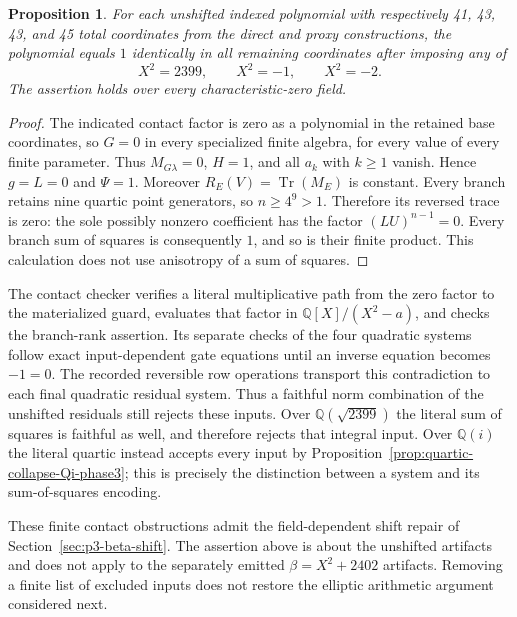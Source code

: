 \documentclass[11pt]{article}
\newtheorem{proposition}[theorem]{Proposition}
\theoremstyle{definition}
\begin{document}
\begin{proposition}\label{prop:indexed-contact-value-one-phase3}
For each unshifted indexed polynomial with respectively
41, 43, 43, and 45 total coordinates from the direct and proxy constructions,
the polynomial equals $1$ identically in all remaining
coordinates after imposing any of
\[
                         X^2=2399,\qquad X^2=-1,
                              \qquad X^2=-2.
\]
The assertion holds over every characteristic-zero field.
\end{proposition}
\begin{proof}
The indicated contact factor is zero as a polynomial in the
retained base coordinates, so $G=0$ in every specialized
finite algebra, for every value of every finite parameter.
Thus $M_{G\lambda}=0$, $H=1$, and all $a_k$ with $k\ge1$
vanish.  Hence $g=L=0$ and $\Psi=1$.
Moreover $R_E(V)=\operatorname{Tr}(M_E)$ is constant.
Every branch retains nine quartic point generators, so
$n\ge4^9>1$.  Therefore its reversed trace is zero:
the sole possibly nonzero coefficient has the factor
$(LU)^{n-1}=0$.  Every branch sum of squares is consequently
$1$, and so is their finite product.  This calculation does
not use anisotropy of a sum of squares.
\end{proof}

The contact checker verifies a literal multiplicative path from
the zero factor to the materialized guard, evaluates that factor
in $\mathbb Q[X]/(X^2-a)$, and checks the branch-rank assertion.
Its separate checks of the four quadratic systems follow exact
input-dependent gate equations until an inverse equation becomes
$-1=0$.  The recorded reversible row operations transport this
contradiction to each final quadratic residual system.  Thus a
faithful norm combination of the unshifted residuals still rejects
these inputs.  Over $\mathbb Q(\sqrt{2399})$ the literal sum of
squares is faithful as well, and therefore rejects that integral
input.  Over $\mathbb Q(i)$ the literal quartic instead accepts
every input by Proposition~\ref{prop:quartic-collapse-Qi-phase3};
this is precisely the distinction between a system and its
sum-of-squares encoding.

These finite contact obstructions admit the field-dependent shift
repair of Section~\ref{sec:p3-beta-shift}.  The assertion above
is about the unshifted artifacts and does not apply to the
separately emitted $\beta=X^2+2402$ artifacts.  Removing a finite
list of excluded inputs does not restore the elliptic arithmetic
argument considered next.
\end{document}
